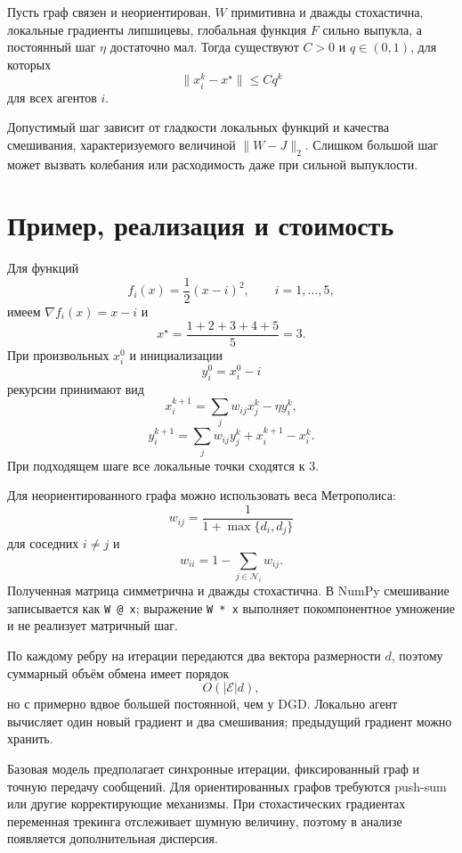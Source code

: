 \begin{theorem}
Пусть граф связен и неориентирован, \(W\) примитивна и дважды
стохастична, локальные градиенты липшицевы, глобальная функция \(F\)
сильно выпукла, а постоянный шаг \(\eta\) достаточно мал. Тогда
существуют \(C>0\) и \(q\in(0,1)\), для которых
\[
    \lVert x_i^k-x^\star\rVert
    \le
    Cq^k
\]
для всех агентов \(i\).
\end{theorem}

Допустимый шаг зависит от гладкости локальных функций и качества
смешивания, характеризуемого величиной \(\lVert W-J\rVert_2\).
Слишком большой шаг может вызвать колебания или расходимость даже при
сильной выпуклости.

\section{Пример, реализация и стоимость}

Для функций
\[
    f_i(x)=\frac12(x-i)^2,
    \qquad
    i=1,\ldots,5,
\]
имеем \(\nabla f_i(x)=x-i\) и
\[
    x^\star
    =
    \frac{1+2+3+4+5}{5}
    =3.
\]
При произвольных \(x_i^0\) и инициализации
\[
    y_i^0=x_i^0-i
\]
рекурсии принимают вид
\[
    x_i^{k+1}
    =
    \sum_jw_{ij}x_j^k-
    \eta y_i^k,
\]
\[
    y_i^{k+1}
    =
    \sum_jw_{ij}y_j^k
    +x_i^{k+1}-x_i^k.
\]
При подходящем шаге все локальные точки сходятся к \(3\).

Для неориентированного графа можно использовать веса Метрополиса:
\[
    w_{ij}
    =
    \frac1{1+\max\{d_i,d_j\}}
\]
для соседних \(i\ne j\) и
\[
    w_{ii}
    =
    1-
    \sum_{j\in\mathcal N_i}w_{ij}.
\]
Полученная матрица симметрична и дважды стохастична. В NumPy
смешивание записывается как \texttt{W @ x}; выражение
\texttt{W * x} выполняет покомпонентное умножение и не реализует
матричный шаг.

По каждому ребру на итерации передаются два вектора размерности \(d\),
поэтому суммарный объём обмена имеет порядок
\[
    O(|\mathcal E|d),
\]
но с примерно вдвое большей постоянной, чем у DGD. Локально агент
вычисляет один новый градиент и два смешивания; предыдущий градиент
можно хранить.

Базовая модель предполагает синхронные итерации, фиксированный граф и
точную передачу сообщений. Для ориентированных графов требуются
push-sum или другие корректирующие механизмы. При стохастических
градиентах переменная трекинга отслеживает шумную величину, поэтому в
анализе появляется дополнительная дисперсия.
